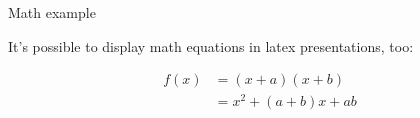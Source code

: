\begin{frame}{Math example}

  It's possible to display math equations in latex presentations, too:

  \begin{align*}
   f(x) &= (x+a)(x+b) \\
        &= x^2 + (a+b)x + ab
  \end{align*}

\end{frame}